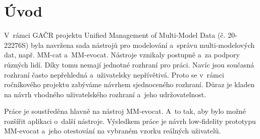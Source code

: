 \chapter*{Úvod}

V~rámci GAČR projektu Unified Management of Multi-Model Data (č. 20-22276S) 
byla navržena sada nástrojů pro modelování a~správu multi-modelových dat, 
např. MM-cat a~MM-evocat. Nástroje vznikaly postupně a~za podpory různých 
lidí. Díky tomu nemají jednotné rozhraní pro práci. Navíc jsou současná 
rozhraní často nepřehledná a~uživatelsky nepřívětivá. Proto se v~rámci 
ročníkového projektu zabýváme návrhem sjednoceného rozhraní. Důraz je 
kladen na návrh vhodného uživatelského rozhraní a~jeho udržovatelnost.

Práce je soustředěna hlavně na nástroj MM-evocat. A~to tak, aby bylo možné rozšířit aplikaci o~další nástroje. Výsledkem práce je návrh low-fidelity prototypu MM-evocat a~jeho otestování na vybraném vzorku reálných uživatelů.

